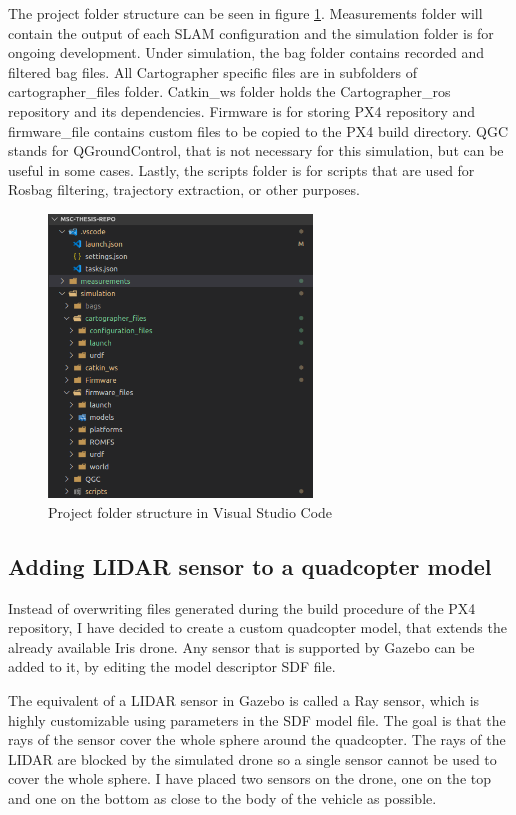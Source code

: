 The project folder structure can be seen in figure \ref{fig:vscode_folder_structure}. Measurements folder
will contain the output of each SLAM configuration and the simulation folder is for ongoing development. Under
simulation, the bag folder contains recorded and filtered bag files. All Cartographer specific files are in
subfolders of cartographer\_files folder.
Catkin\_ws folder holds the Cartographer\_ros repository and its
dependencies. Firmware is for storing PX4 repository and firmware\_file contains custom files to be copied
to the PX4 build directory. QGC stands for QGroundControl, that is not necessary for this simulation, but
can be useful in some cases. Lastly, the scripts folder is for scripts that are used for Rosbag filtering,
trajectory extraction, or other purposes.


\begin{figure}[!ht]
    \centering
    \includegraphics[width=70mm, keepaspectratio]{figures/vscode_folder_structure.png}
    \caption{Project folder structure in Visual Studio Code}
    \label{fig:vscode_folder_structure}
\end{figure}


\subsection{Adding LIDAR sensor to a quadcopter model}
Instead of overwriting files generated during the build procedure of the PX4 repository, I have decided to
create a custom quadcopter model, that extends the already available Iris drone. Any sensor that is
supported by Gazebo can be added to it, by editing the model descriptor SDF file.

The equivalent of a LIDAR sensor in Gazebo is called a Ray sensor, which is highly customizable using
parameters in the SDF model file. The goal is that the rays of the sensor cover the whole sphere around
the quadcopter. The rays of the LIDAR are blocked by the simulated drone so a single sensor
cannot be used to cover the whole sphere.
I have placed two sensors on the drone, one on the top and one on the bottom as close to the body
of the vehicle as possible.

